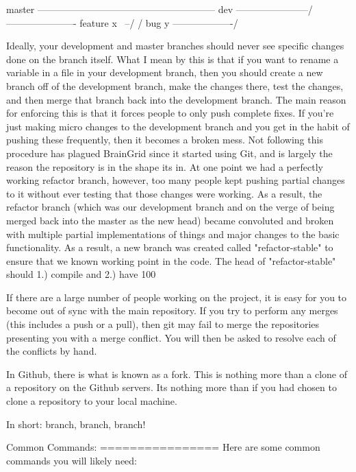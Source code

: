 	master     --------------------------------------------------------
	dev            \------------------------/  \-----------------------
	feature x              \   \---/              /
	bug y	                \--------------------/

Ideally, your development and master branches should never see specific changes done on the branch itself.  What I mean by this is that if you want to rename a variable in a file in your development branch, then you should create a new branch off of the development branch, make the changes there, test the changes, and then merge that branch back into the development branch. The main reason for enforcing this is that it forces people to only push complete fixes.  If you're just making micro changes to the development branch and you get in the habit of pushing these frequently, then it becomes a broken mess.  Not following this procedure has plagued BrainGrid since it started using Git, and is largely the reason the repository is in the shape its in.  At one point we had a perfectly working refactor branch, however, too many people kept pushing partial changes to it without ever testing that those changes were working.  As a result, the refactor branch (which was our development branch and on the verge of being merged back into the master as the new head) became convoluted and broken with multiple partial implementations of things and major changes to the basic functionality.  As a result, a new branch was created called "refactor-stable" to ensure that we known working point in the code.  The head of "refactor-stable" should 1.) compile and 2.) have 100%

If there are a large number of people working on the project, it is easy for you to become out of sync with the main repository.  If you try to perform any merges (this includes a push or a pull), then git may fail to merge the repositories presenting you with a merge conflict.  You will then be asked to resolve each of the conflicts by hand.  

In Github, there is what is known as a fork.  This is nothing more than a clone of a repository on the Github servers.  Its nothing more than if you had chosen to clone a repository to your local machine.  

In short: branch, branch, branch!


Common Commands:
================
Here are some common commands you will likely need:

